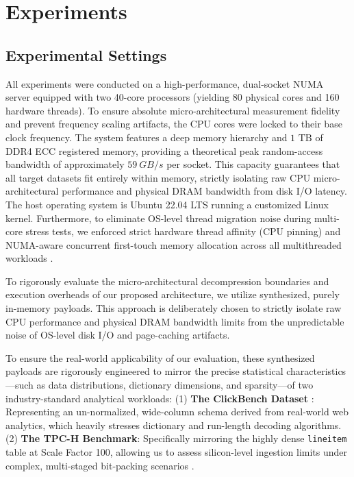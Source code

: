 \documentclass[onecolumn]{IEEEtran}
\numberwithin{equation}{section}
\theoremstyle{definition}
\theoremstyle{remark}
\begin{document}
\section{Experiments}

\subsection{Experimental Settings}

All experiments were conducted on a high-performance, dual-socket NUMA server equipped with two 40-core processors (yielding 80 physical cores and 160 hardware threads). To ensure absolute micro-architectural measurement fidelity and prevent frequency scaling artifacts, the CPU cores were locked to their base clock frequency. The system features a deep memory hierarchy and $1\text{ TB}$ of DDR4 ECC registered memory, providing a theoretical peak random-access bandwidth of approximately $\SI{59}{GB/s}$ per socket. This capacity guarantees that all target datasets fit entirely within memory, strictly isolating raw CPU micro-architectural performance and physical DRAM bandwidth from disk I/O latency. The host operating system is Ubuntu 22.04 LTS running a customized Linux kernel. Furthermore, to eliminate OS-level thread migration noise during multi-core stress tests, we enforced strict hardware thread affinity (CPU pinning) and NUMA-aware concurrent first-touch memory allocation across all multithreaded workloads \cite{leis2014morsel}.

To rigorously evaluate the micro-architectural decompression boundaries and execution overheads of our proposed architecture, we utilize synthesized, purely in-memory payloads. This approach is deliberately chosen to strictly isolate raw CPU performance and physical DRAM bandwidth limits from the unpredictable noise of OS-level disk I/O and page-caching artifacts. 

To ensure the real-world applicability of our evaluation, these synthesized payloads are rigorously engineered to mirror the precise statistical characteristics---such as data distributions, dictionary dimensions, and sparsity---of two industry-standard analytical workloads:
(1) \textbf{The ClickBench Dataset} \cite{clickhouse2022clickbench}: Representing an un-normalized, wide-column schema derived from real-world web analytics, which heavily stresses dictionary and run-length decoding algorithms.
(2) \textbf{The TPC-H Benchmark}: Specifically mirroring the highly dense \texttt{lineitem} table at Scale Factor 100, allowing us to assess silicon-level ingestion limits under complex, multi-staged bit-packing scenarios \cite{kuschewski2023btrblocks}.
\end{document}
